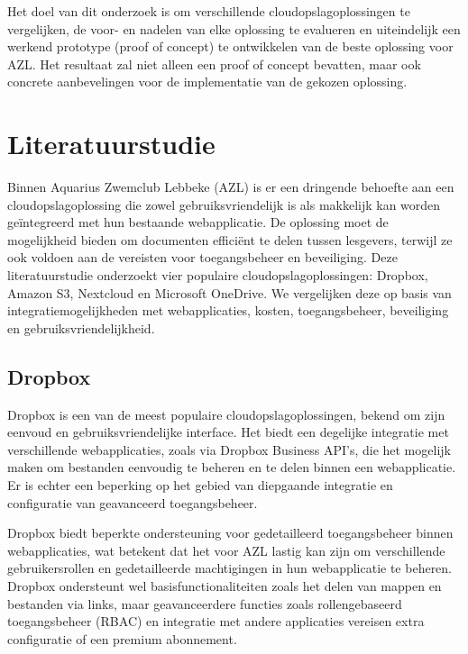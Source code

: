 Het doel van dit onderzoek is om verschillende cloudopslagoplossingen te vergelijken, de voor- en nadelen van elke oplossing te evalueren en uiteindelijk een werkend prototype (proof of concept) te ontwikkelen van de beste oplossing voor AZL. Het resultaat zal niet alleen een proof of concept bevatten, maar ook concrete aanbevelingen voor de implementatie van de gekozen oplossing.


\section{Literatuurstudie}%
\label{sec:literatuurstudie}

Binnen Aquarius Zwemclub Lebbeke (AZL) is er een dringende behoefte aan een cloudopslagoplossing die zowel gebruiksvriendelijk is als makkelijk kan worden geïntegreerd met hun bestaande webapplicatie. De oplossing moet de mogelijkheid bieden om documenten efficiënt te delen tussen lesgevers, terwijl ze ook voldoen aan de vereisten voor toegangsbeheer en beveiliging. Deze literatuurstudie onderzoekt vier populaire cloudopslagoplossingen: Dropbox, Amazon S3, Nextcloud en Microsoft OneDrive. We vergelijken deze op basis van integratiemogelijkheden met webapplicaties, kosten, toegangsbeheer, beveiliging en gebruiksvriendelijkheid.

\subsection{Dropbox}
Dropbox is een van de meest populaire cloudopslagoplossingen, bekend om zijn eenvoud en gebruiksvriendelijke interface. Het biedt een degelijke integratie met verschillende webapplicaties, zoals via Dropbox Business API's, die het mogelijk maken om bestanden eenvoudig te beheren en te delen binnen een webapplicatie. Er is echter een beperking op het gebied van diepgaande integratie en configuratie van geavanceerd toegangsbeheer.

Dropbox biedt beperkte ondersteuning voor gedetailleerd toegangsbeheer binnen webapplicaties, wat betekent dat het voor AZL lastig kan zijn om verschillende gebruikersrollen en gedetailleerde machtigingen in hun webapplicatie te beheren. Dropbox ondersteunt wel basisfunctionaliteiten zoals het delen van mappen en bestanden via links, maar geavanceerdere functies zoals rollengebaseerd toegangsbeheer (RBAC) en integratie met andere applicaties vereisen extra configuratie of een premium abonnement.

